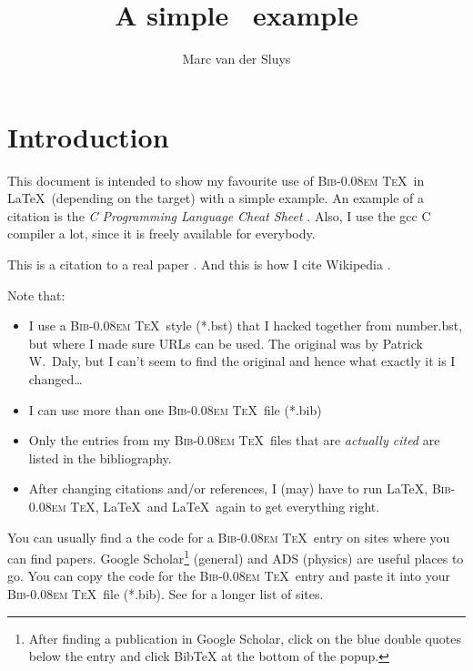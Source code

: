 \documentclass[11pt]{article}  %
\title{A simple \BibTeX\ example}
\author{Marc van der Sluys}
\DeclareRobustCommand{\BibTeX}{{\normalfont\scshape Bib\kern-0.08em \TeX}}
\begin{document}
\maketitle

\tableofcontents


\section{Introduction}

This document is intended to show my favourite use of \BibTeX\ in \LaTeX\ (depending on the target) with a
simple example.  An example of a citation is the \emph{C Programming Language Cheat Sheet} \cite{Choudhary}.
Also, I use the gcc C compiler \cite{gcc} a lot, since it is freely available for everybody.

This is a citation to a real paper \cite{leung1980scheduling}.  And this is how I cite Wikipedia \cite{wiki:Cron}.

Note that:
\begin{itemize}
\item I use a \BibTeX\ style (*.bst) that I hacked together from number.bst, but where I made sure URLs can be
  used.  The original was by Patrick W.\ Daly, but I can't seem to find the original and hence what exactly it
  is I changed\ldots
\item I can use more than one \BibTeX\ file (*.bib)
\item Only the entries from my \BibTeX\ files that are \emph{actually cited} are listed in the bibliography.
\item After changing citations and/or references, I (may) have to run \LaTeX, \BibTeX, \LaTeX\ and \LaTeX\
  again to get everything right.
\end{itemize}

You can usually find a the code for a \BibTeX\ entry on sites where you can find papers.  Google
Scholar\footnote{After finding a publication in Google Scholar, click on the blue double quotes below the
  entry and click BibTeX at the bottom of the popup.}  (general) and ADS (physics) are useful places to go.
You can copy the code for the \BibTeX\ entry and paste it into your \BibTeX\ file (*.bib).  See
\cite{BibTeXentries} for a longer list of sites.



\end{document}
